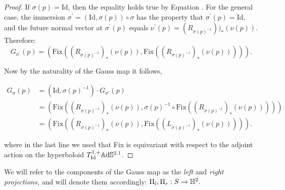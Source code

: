     \begin{proof}
        If $\sigma(p)=\text{Id}$, then the equality holds true by Equation . For the general case, the immersion $\sigma^{\prime} =(\text{Id},\sigma(p))\circ\sigma$ has the property that $\sigma^{\prime}(p)=\text{Id}$, and the future normal vector at $\sigma^{\prime} (p)$ equals $\nu^{\prime} (p)=(R_{\sigma(p)^{-1}}))_{\ast} (\nu(p))$. Therefore: 
        \[
            G_{\sigma^{\prime} }(p)=(\text{Fix}((R_{\sigma(p)^{-1}})_{\ast} (\nu(p)),\text{Fix}((R_{\sigma(p)^{-1}})_{\ast} (\nu(p))))).
        \]

        Now by the naturality of the Gauss map it follows, 
        
        \begin{align*}
            G_\sigma(p)&=(\text{Id},\sigma(p)^{-1})\cdot G_{\sigma^{\prime}}(p) \\
            &=(\text{Fix}((R_{\sigma(p)^{-1}})_{\ast} (\nu(p)),\sigma(p)^{-1}\circ\text{Fix}((R_{\sigma(p)^{-1}})_{\ast} (\nu(p))))) \\
            &=(\text{Fix}((R_{\sigma(p)^{-1}})_{\ast} (\nu(p)),\text{Fix}((L_{\sigma(p)^{-1}})_{\ast} (\nu(p))))).
        \end{align*}
        
        where in the last line we used that Fix is equivariant with respect to the adjoint action on the hyperboloid $T_{\text{Id}}^{1,+}\mathbb{A}\mathrm{d}\mathbb{S}^{2.1}$.
        
    \end{proof}

    We will refer to the components of the Gauss map as the \textit{left} and \textit{right projections,} and will denote them accordingly: $\Pi_{l},\Pi_{r}:S\to\mathbb{H}^2.$\\




